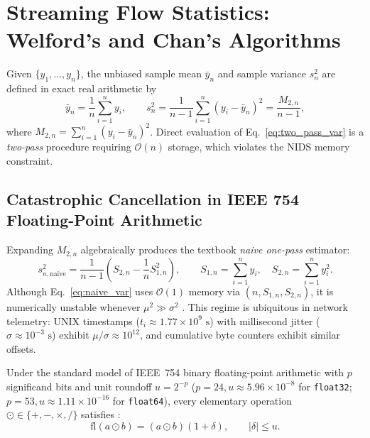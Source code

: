 \documentclass[oneside,noexaminfo,english]{sapthesis}
\numberwithin{equation}{section}
\numberwithin{figure}{section}
\numberwithin{table}{section}
\theoremstyle{compactplain}
\theoremstyle{compactdef}
\theoremstyle{compactrem}
\begin{document}
\section{Streaming Flow Statistics: Welford's and Chan's Algorithms}
\label{sec:welford}

Given $\{y_1, \dots, y_n\}$, the unbiased sample mean $\bar{y}_n$ and sample variance $s_n^2$ are defined in exact real arithmetic by
\begin{equation}
    \label{eq:two_pass_var}
    \bar{y}_n = \frac{1}{n}\sum_{i=1}^n y_i, \qquad s_n^2 = \frac{1}{n-1}\sum_{i=1}^n (y_i - \bar{y}_n)^2 = \frac{M_{2,n}}{n-1},
\end{equation}
where $M_{2,n} = \sum_{i=1}^n (y_i - \bar{y}_n)^2$. Direct evaluation of Eq.~\eqref{eq:two_pass_var} is a \emph{two-pass} procedure requiring $\mathcal{O}(n)$ storage, which violates the NIDS memory constraint.

\subsection{Catastrophic Cancellation in IEEE 754 Floating-Point Arithmetic}
Expanding $M_{2,n}$ algebraically produces the textbook \emph{naive one-pass} estimator:
\begin{equation}
    \label{eq:naive_var}
    s_{n,\mathrm{naive}}^2 = \frac{1}{n-1}\left( S_{2,n} - \frac{1}{n} S_{1,n}^2 \right), \qquad S_{1,n} = \sum_{i=1}^n y_i, \quad S_{2,n} = \sum_{i=1}^n y_i^2.
\end{equation}
Although Eq.~\eqref{eq:naive_var} uses $\mathcal{O}(1)$ memory via $(n, S_{1,n}, S_{2,n})$, it is numerically unstable whenever $\mu^2 \gg \sigma^2$ \cite{chan1983,higham2002}. This regime is ubiquitous in network telemetry: UNIX timestamps ($t_i \approx 1.77 \times 10^9\text{ s}$) with millisecond jitter ($\sigma \approx 10^{-3}\text{ s}$) exhibit $\mu / \sigma \approx 10^{12}$, and cumulative byte counters exhibit similar offsets.

Under the standard model of IEEE~754 binary floating-point arithmetic with $p$ significand bits and unit roundoff $u = 2^{-p}$ ($p=24, u \approx 5.96 \times 10^{-8}$ for \texttt{float32}; $p=53, u \approx 1.11 \times 10^{-16}$ for \texttt{float64}), every elementary operation $\odot \in \{+, -, \times, /\}$ satisfies \cite{higham2002}:
\begin{equation}
    \label{eq:fp_axiom}
    \mathrm{fl}(a \odot b) = (a \odot b)(1 + \delta), \qquad |\delta| \le u.
\end{equation}
\end{document}
